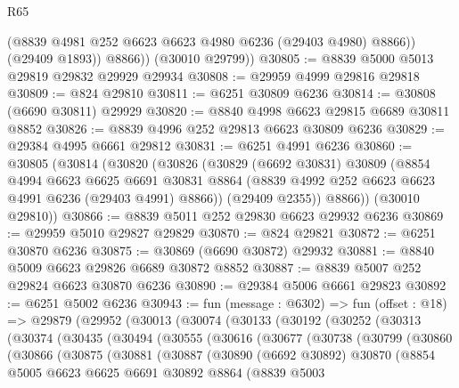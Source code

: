 \begin{lexlean}{R65}
\begin{coremodule}
{              (@8839 @4981 @252 @6623 @6623 @4980 @6236 (@29403 @4980) @8866))
            (@29409 @1893))
          @8866))
      (@30010 @29799))
@30805 := @8839 @5000 @5013 @29819 @29832 @29929 @29934
@30808 := @29959 @4999 @29816 @29818
@30809 := @824 @29810
@30811 := @6251 @30809 @6236
@30814 := @30808 (@6690 @30811) @29929
@30820 := @8840 @4998 @6623 @29815 @6689 @30811 @8852
@30826 := @8839 @4996 @252 @29813 @6623 @30809 @6236
@30829 := @29384 @4995 @6661 @29812
@30831 := @6251 @4991 @6236
@30860 := @30805
    (@30814
      (@30820
        (@30826
          (@30829
            (@6692 @30831)
            @30809
            (@8854
              @4994
              @6623
              @6625
              @6691
              @30831
              @8864
              (@8839 @4992 @252 @6623 @6623 @4991 @6236 (@29403 @4991) @8866))
            (@29409 @2355))
          @8866))
      (@30010 @29810))
@30866 := @8839 @5011 @252 @29830 @6623 @29932 @6236
@30869 := @29959 @5010 @29827 @29829
@30870 := @824 @29821
@30872 := @6251 @30870 @6236
@30875 := @30869 (@6690 @30872) @29932
@30881 := @8840 @5009 @6623 @29826 @6689 @30872 @8852
@30887 := @8839 @5007 @252 @29824 @6623 @30870 @6236
@30890 := @29384 @5006 @6661 @29823
@30892 := @6251 @5002 @6236
@30943 := fun (message : @6302) =>
  fun (offset : @18) =>
  @29879
    (@29952
      (@30013
        (@30074
          (@30133
            (@30192
              (@30252
                (@30313
                  (@30374
                    (@30435
                      (@30494
                        (@30555
                          (@30616
                            (@30677
                              (@30738
                                (@30799
                                  (@30860
                                    (@30866
                                      (@30875
                                        (@30881
                                          (@30887
                                            (@30890
                                              (@6692 @30892)
                                              @30870
                                              (@8854
                                                @5005
                                                @6623
                                                @6625
                                                @6691
                                                @30892
                                                @8864
                                                (@8839
                                                  @5003
}
\end{coremodule}
\end{lexlean}
